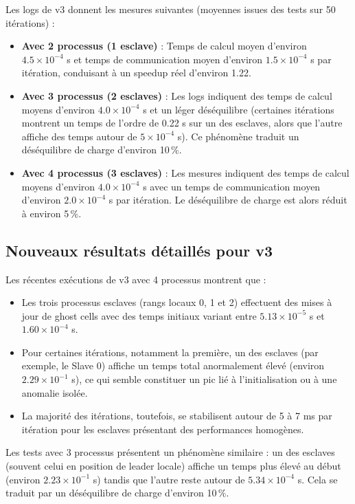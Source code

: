 \documentclass[a4paper,13pt]{book}
\begin{document}
Les logs de v3 donnent les mesures suivantes (moyennes issues des tests sur 50 itérations) :
\begin{itemize}
    \item \textbf{Avec 2 processus (1 esclave)} : Temps de calcul moyen d'environ \(4.5\times10^{-4}\) s et temps de communication moyen d'environ \(1.5\times10^{-4}\) s par itération, conduisant à un speedup réel d'environ 1.22.
    \item \textbf{Avec 3 processus (2 esclaves)} : Les logs indiquent des temps de calcul moyens d'environ \(4.0\times10^{-4}\) s et un léger déséquilibre (certaines itérations montrent un temps de l'ordre de 0.22 s sur un des esclaves, alors que l'autre affiche des temps autour de \(5\times10^{-4}\) s). Ce phénomène traduit un déséquilibre de charge d'environ 10\,\%.
    \item \textbf{Avec 4 processus (3 esclaves)} : Les mesures indiquent des temps de calcul moyens d'environ \(4.0\times10^{-4}\) s avec un temps de communication moyen d'environ \(2.0\times10^{-4}\) s par itération. Le déséquilibre de charge est alors réduit à environ 5\,\%.
\end{itemize}

\subsection{Nouveaux résultats détaillés pour v3}
Les récentes exécutions de v3 avec 4 processus montrent que :
\begin{itemize}
    \item Les trois processus esclaves (rangs locaux 0, 1 et 2) effectuent des mises à jour de ghost cells avec des temps initiaux variant entre \(5.13\times10^{-5}\) s et \(1.60\times10^{-4}\) s.
    \item Pour certaines itérations, notamment la première, un des esclaves (par exemple, le Slave 0) affiche un temps total anormalement élevé (environ \(2.29\times10^{-1}\) s), ce qui semble constituer un pic lié à l'initialisation ou à une anomalie isolée.
    \item La majorité des itérations, toutefois, se stabilisent autour de 5 à 7 ms par itération pour les esclaves présentant des performances homogènes.
\end{itemize}

Les tests avec 3 processus présentent un phénomène similaire : un des esclaves (souvent celui en position de leader locale) affiche un temps plus élevé au début (environ \(2.23\times10^{-1}\) s) tandis que l'autre reste autour de \(5.34\times10^{-4}\) s. Cela se traduit par un déséquilibre de charge d'environ 10\,\%.
\end{document}
